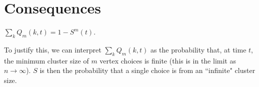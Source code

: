 \documentclass[twoside,10pt]{report}
\begin{document}

\section{Consequences}

\begin{prop}
	$\sum_{k} Q_{m}(k,t) = 1 - S^{m}(t)$.
\end{prop}
	To justify this, we can interpret $\sum_{k}Q_{m}(k, t)$ as the probability that, at time $t$, the minimum cluster size of $m$ vertex choices is finite (this is in the limit as $n\to \infty$). $S$ is then the probability that a single choice is from an ``infinite" cluster size. 
\end{document}
